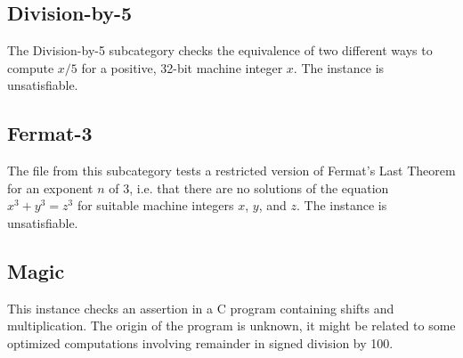 \documentclass[conference]{IEEEtran}
\begin{document}


\subsection{Division-by-5}

The Division-by-5 subcategory checks the equivalence of
two different ways to compute $x/5$ for a positive, 32-bit machine integer $x$.
The instance is unsatisfiable.



\subsection{Fermat-3}

The file from this subcategory tests a restricted version of Fermat's Last Theorem
for an exponent $n$ of 3, i.e. that there are no solutions of the equation
$x^3 + y^3 = z^3$ for suitable machine integers $x$, $y$, and $z$.
The instance is unsatisfiable.



\subsection{Magic}

This instance checks an assertion in a C program containing shifts and multiplication.
The origin of the program is unknown, it might be related to some optimized computations
involving remainder in signed division by 100.




%
%
%
\end{document}
